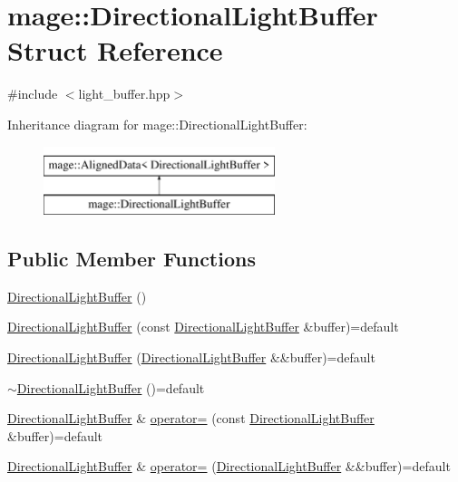 \hypertarget{structmage_1_1_directional_light_buffer}{}\section{mage\+:\+:Directional\+Light\+Buffer Struct Reference}
\label{structmage_1_1_directional_light_buffer}


{\ttfamily \#include $<$light\+\_\+buffer.\+hpp$>$}

Inheritance diagram for mage\+:\+:Directional\+Light\+Buffer\+:\begin{figure}[H]
\begin{center}
\leavevmode
\includegraphics[height=2.000000cm]{structmage_1_1_directional_light_buffer}
\end{center}
\end{figure}
\subsection*{Public Member Functions}
\begin{DoxyCompactItemize}
\item 
\hyperlink{structmage_1_1_directional_light_buffer_a73a87ba7b016b6c62375da62b4fdf7b6}{Directional\+Light\+Buffer} ()
\item 
\hyperlink{structmage_1_1_directional_light_buffer_a2b61889818f441416421511aa1dcd294}{Directional\+Light\+Buffer} (const \hyperlink{structmage_1_1_directional_light_buffer}{Directional\+Light\+Buffer} \&buffer)=default
\item 
\hyperlink{structmage_1_1_directional_light_buffer_aed86ef6ac6e2dfd9cda2c2be844ceca5}{Directional\+Light\+Buffer} (\hyperlink{structmage_1_1_directional_light_buffer}{Directional\+Light\+Buffer} \&\&buffer)=default
\item 
\hyperlink{structmage_1_1_directional_light_buffer_a6d9c1eb4b4b15c586524e5436d9d6162}{$\sim$\+Directional\+Light\+Buffer} ()=default
\item 
\hyperlink{structmage_1_1_directional_light_buffer}{Directional\+Light\+Buffer} \& \hyperlink{structmage_1_1_directional_light_buffer_ae076cdb33035cf8c7ce14750eaf3601a}{operator=} (const \hyperlink{structmage_1_1_directional_light_buffer}{Directional\+Light\+Buffer} \&buffer)=default
\item 
\hyperlink{structmage_1_1_directional_light_buffer}{Directional\+Light\+Buffer} \& \hyperlink{structmage_1_1_directional_light_buffer_a9af62b47c7ba1b1f6833e8da79b8c054}{operator=} (\hyperlink{structmage_1_1_directional_light_buffer}{Directional\+Light\+Buffer} \&\&buffer)=default
\end{DoxyCompactItemize}
